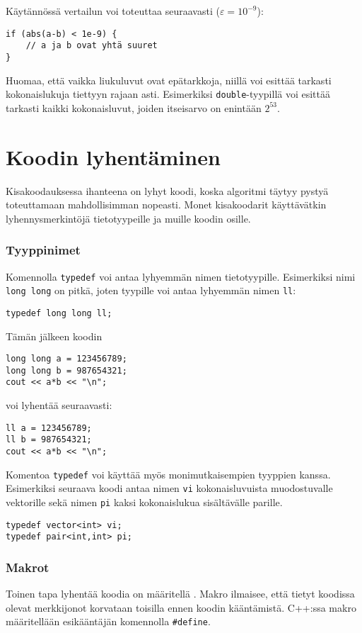 Käytännössä vertailun voi toteuttaa seuraavasti ($\varepsilon=10^{-9}$):

\begin{lstlisting}
if (abs(a-b) < 1e-9) {
    // a ja b ovat yhtä suuret
}
\end{lstlisting}

Huomaa, että
vaikka liukuluvut ovat epätarkkoja, niillä voi esittää
tarkasti kokonaislukuja tiettyyn rajaan asti.
Esimerkiksi \texttt{double}-tyypillä voi esittää
tarkasti kaikki kokonaisluvut, joiden itseisarvo
on enintään $2^{53}$.

\section{Koodin lyhentäminen}

Kisakoodauksessa ihanteena on lyhyt koodi,
koska algoritmi täytyy pystyä toteuttamaan
mahdollisimman nopeasti.
Monet kisakoodarit käyttävätkin lyhennysmerkintöjä
tietotyypeille ja muille koodin osille.

\subsubsection{Tyyppinimet}
Komennolla \texttt{typedef} voi antaa lyhyemmän
nimen tietotyypille.
Esimerkiksi nimi \texttt{long long} on pitkä,
joten tyypille voi antaa lyhyemmän nimen \texttt{ll}:
\begin{lstlisting}
typedef long long ll;
\end{lstlisting}
Tämän jälkeen koodin
\begin{lstlisting}
long long a = 123456789;
long long b = 987654321;
cout << a*b << "\n";
\end{lstlisting}
voi lyhentää seuraavasti:
\begin{lstlisting}
ll a = 123456789;
ll b = 987654321;
cout << a*b << "\n";
\end{lstlisting}

Komentoa \texttt{typedef} voi käyttää myös
monimutkaisempien tyyppien kanssa.
Esimerkiksi seuraava koodi antaa nimen \texttt{vi}
kokonaisluvuista muodostuvalle vektorille
sekä nimen \texttt{pi} kaksi
kokonaislukua sisältävälle parille.
\begin{lstlisting}
typedef vector<int> vi;
typedef pair<int,int> pi;
\end{lstlisting}

\subsubsection{Makrot}
Toinen tapa lyhentää koodia on määritellä .
Makro ilmaisee, että tietyt koodissa olevat
merkkijonot korvataan toisilla ennen koodin
kääntämistä.
C++:ssa makro määritellään
esikääntäjän komennolla \texttt{\#define}.

